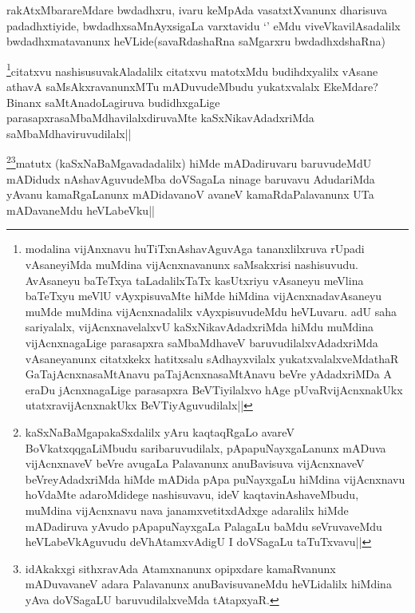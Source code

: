 \begin{artha}
rakAtxMbarareMdare bwdadhxru, ivaru keMpAda vasatxtXvanunx dharisuva padadhxtiyide, bwdadhxsaMnAyxsigaLa varxtavidu `\stext' eMdu viveVkavilAsadalilx bwdadhxmatavanunx heVLide(savaRdashaRna saMgarxru bwdadhxdshaRna)
\end{artha}


\begin{artha}
\footnote{modalina vijAnxnavu huTiTxnAshavAguvAga tananxlilxruva rUpadi vAsaneyiMda muMdina vijAcnxnavanunx saMsakxrisi nashisuvudu. AvAsaneyu baTeTxya taLadalilxTaTx kasUtxriyu vAsaneyu meVlina baTeTxyu meVlU vAyxpisuvaMte hiMde hiMdina vijAcnxnadavAsaneyu muMde muMdina vijAcnxnadalilx vAyxpisuvudeMdu heVLuvaru. adU saha sariyalalx, vijAcnxnavelalxvU kaSxNikavAdadxriMda hiMdu muMdina vijAcnxnagaLige parasapxra saMbaMdhaveV baruvudilalxvAdadxriMda vAsaneyanunx citatxkekx hatitxsalu sAdhayxvilalx yukatxvalalxveMdathaR GaTajAcnxnasaMtAnavu paTajAcnxnasaMtAnavu beVre yAdadxriMDa A eraDu jAcnxnagaLige parasapxra BeVTiyilalxvo hAge pUvaRvijAcnxnakUkx utatxravijAcnxnakUkx BeVTiyAguvudilalx||}citatxvu nashisusuvakAladalilx citatxvu matotxMdu budihdxyalilx vAsane athavA saMsAkxravanunxMTu mADuvudeMbudu yukatxvalalx EkeMdare? Binanx saMtAnadoLagiruva budidhxgaLige parasapxrasaMbaMdhavilalxdiruvaMte kaSxNikavAdadxriMda saMbaMdhaviruvudilalx||
\end{artha}

\begin{artha}
\footnote{kaSxNaBaMgapakaSxdalilx yAru kaqtaqRgaLo avareV BoVkatxqqgaLiMbudu saribaruvudilalx, pApapuNayxgaLanunx mADuva vijAcnxnaveV beVre avugaLa Palavanunx anuBavisuva vijAcnxnaveV beVreyAdadxriMda hiMde mADida pApa puNayxgaLu hiMdina vijAcnxnavu hoVdaMte adaroMdidege nashisuvavu, ideV kaqtavinAshaveMbudu, muMdina vijAcnxnavu nava janamxvetitxdAdxge adaralilx hiMde mADadiruva yAvudo pApapuNayxgaLa PalagaLu baMdu seVruvaveMdu heVLabeVkAguvudu deVhAtamxvAdigU I doVSagaLu taTuTxvavu||}\footnote{idAkakxgi sithxravAda Atamxnanunx opipxdare kamaRvanunx mADuvavaneV adara Palavanunx anuBavisuvaneMdu heVLidalilx hiMdina yAva doVSagaLU baruvudilalxveMda tAtapxyaR.}matutx (kaSxNaBaMgavadadalilx) hiMde mADadiruvaru baruvudeMdU mADidudx nAshavAguvudeMba doVSagaLa ninage baruvavu AdudariMda yAvanu kamaRgaLanunx mADidavanoV avaneV kamaRdaPalavanunx UTa mADavaneMdu heVLabeVku||
\end{artha}


